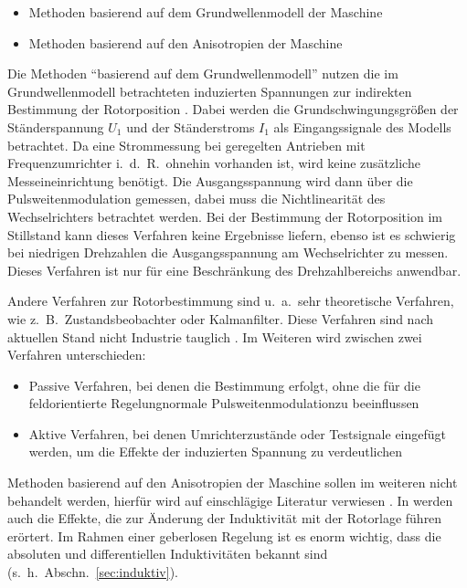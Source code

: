 \documentclass[conference,twocolumn]{IEEEtran}
\newcommand{\FOR}{feldorientierte Regelung}
\newcommand{\pwm}{Pulsweitenmodulation}
\begin{document}
\begin{itemize}
	\item Methoden basierend auf dem Grundwellenmodell der Maschine
	\item Methoden basierend auf den Anisotropien der Maschine
\end{itemize}

Die Methoden \enquote{basierend auf dem Grundwellenmodell} nutzen die im Grundwellenmodell betrachteten induzierten Spannungen zur indirekten Bestimmung der Rotorposition \autocite{Perassi2006}.
Dabei werden die Grundschwingungsgrößen der Ständerspannung $U_{1}$ und der Ständerstroms $I_{1}$ als Eingangssignale des Modells betrachtet.
Da eine Strommessung bei geregelten Antrieben mit Frequenzumrichter i.\ d.\ R.\ ohnehin vorhanden ist, wird keine zusätzliche Messeineinrichtung benötigt.
Die Ausgangsspannung wird dann über die Pulsweitenmodulation gemessen, dabei muss die Nichtlinearität des Wechselrichters betrachtet werden.
Bei der Bestimmung der Rotorposition im Stillstand kann dieses Verfahren keine Ergebnisse liefern, ebenso ist es schwierig bei niedrigen Drehzahlen die Ausgangsspannung am Wechselrichter zu messen.
Dieses Verfahren ist nur für eine Beschränkung des Drehzahlbereichs anwendbar.

Andere Verfahren zur Rotorbestimmung sind u.\ a.\ sehr theoretische Verfahren, wie z.\ B.\ Zustandsbeobachter oder Kalmanfilter.
Diese Verfahren sind nach aktuellen Stand nicht Industrie tauglich \autocite{Perassi2006}.
Im Weiteren wird zwischen zwei Verfahren unterschieden:

\begin{itemize}
\item Passive Verfahren, bei denen die Bestimmung erfolgt, ohne die für die \FOR normale \pwm zu beeinflussen
\item Aktive Verfahren, bei denen Umrichterzustände oder Testsignale eingefügt werden, um die Effekte der induzierten Spannung zu verdeutlichen
\end{itemize}

Methoden basierend auf den Anisotropien der Maschine sollen im weiteren nicht behandelt werden, hierfür wird auf einschlägige Literatur verwiesen \autocites{Perassi2006}{kiel2005}.
In \textcite{kiel2005} werden auch die Effekte, die zur Änderung der Induktivität mit der Rotorlage führen erörtert.
Im Rahmen einer geberlosen Regelung ist es enorm wichtig, dass die absoluten und differentiellen Induktivitäten bekannt sind (s.~h.~Abschn.~\ref{sec:induktiv}).
\end{document}
